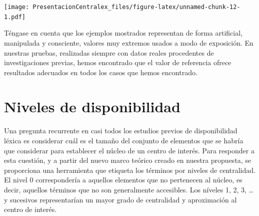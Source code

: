 \documentclass[
]{article}
\begin{document}
\texttt{[image: PresentacionCentralex\_files/figure-latex/unnamed-chunk-12-1.pdf]}

Téngase en cuenta que los ejemplos mostrados representan de forma
artificial, manipulada y consciente, valores muy extremos usados a modo
de exposición. En nuestras pruebas, realizadas siempre con datos reales
procedentes de investigaciones previas, hemos encontrado que el valor de
referencia ofrece resultados adecuados en todos los casos que hemos
encontrado.

\hypertarget{niveles-de-disponibilidad}{%
\section{Niveles de disponibilidad}\label{niveles-de-disponibilidad}}

Una pregunta recurrente en casi todos los estudios previos de
disponibilidad léxica es considerar cuál es el tamaño del conjunto de
elementos que se habría que considerar para establecer el núcleo de un
centro de interés. Para responder a esta cuestión, y a partir del nuevo
marco teórico creado en nuestra propuesta, se proporciona una
herramienta que etiqueta los términos por niveles de centralidad. El
nivel 0 correspondería a aquellos elementos que no pertenecen al núcleo,
es decir, aquellos términos que no son generalmente accesibles. Los
níveles 1, 2, 3, \ldots{} y sucesivos representarían un mayor grado de
centralidad y aproximación al centro de interés.
\end{document}
